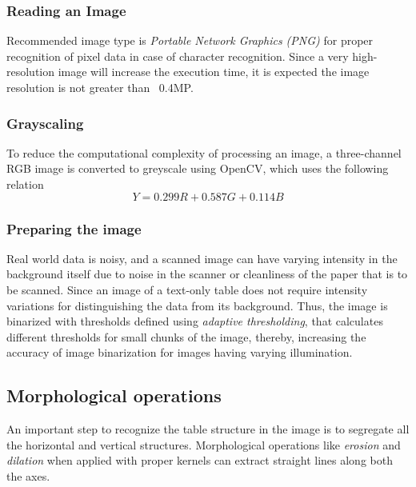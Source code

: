 \documentclass[10pt,journal,compsoc]{IEEEtran}
\begin{document}
\subsubsection{Reading an Image}
Recommended image type is \textit{Portable Network Graphics (PNG)} for proper recognition of pixel data in case of character recognition. Since a very high-resolution image will increase the execution time, it is expected the image resolution is not greater than ~0.4MP.

\subsubsection{Grayscaling}
To reduce the computational complexity of processing an image, a three-channel RGB image is converted to greyscale using OpenCV, which uses the following relation
\begin{equation}
    Y = 0.299R + 0.587G + 0.114B
\end{equation}

\subsubsection{Preparing the image}
Real world data is noisy, and a scanned image can have varying intensity in the background itself due to noise in the scanner or cleanliness of the paper that is to be scanned. Since an image of a text-only table does not require intensity variations for distinguishing the data from its background. Thus, the image is binarized with thresholds defined using \textit{adaptive thresholding}, that calculates different thresholds for small chunks of the image, thereby, increasing the accuracy of image binarization for images having varying illumination.


\subsection{Morphological operations}
An important step to recognize the table structure in the image is to segregate all the horizontal and vertical structures. Morphological operations like \textit{erosion} and \textit{dilation} when applied with proper kernels can extract straight lines along both the axes.
\end{document}
